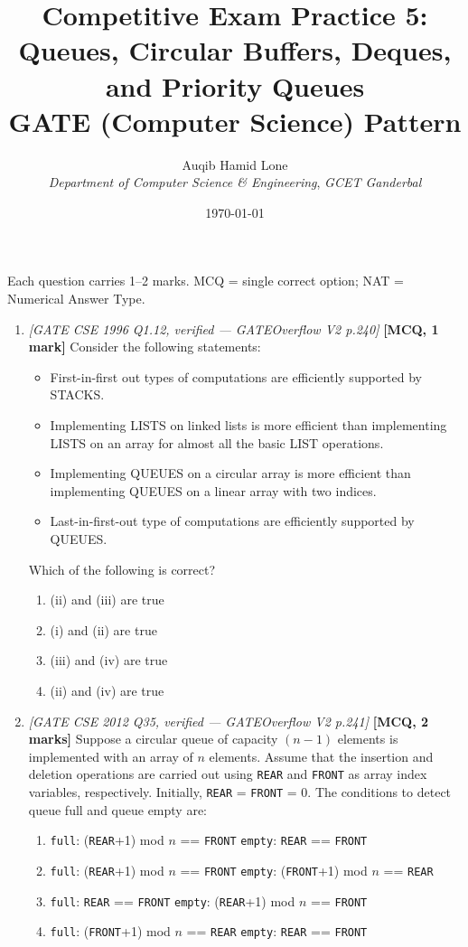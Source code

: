 \documentclass[11pt]{article}
\title{Competitive Exam Practice 5: Queues, Circular Buffers, Deques, and Priority Queues\\\large GATE (Computer Science) Pattern}
\author{Auqib Hamid Lone\\[0.3em]
  \emph{Department of Computer Science \& Engineering}, \emph{GCET Ganderbal}}
\date{\today}
\begin{document}
\maketitle

\noindent Each question carries 1--2 marks. MCQ = single correct option; NAT = Numerical Answer Type.

\begin{enumerate}
\item[\textbf{Q1}] \textit{[GATE CSE 1996 Q1.12, verified --- GATEOverflow V2 p.240]} \textbf{[MCQ, 1 mark]} Consider the following statements:
\begin{itemize}
  \item[(i)] First-in-first out types of computations are efficiently supported by STACKS.
  \item[(ii)] Implementing LISTS on linked lists is more efficient than implementing LISTS on an array for almost all the basic LIST operations.
  \item[(iii)] Implementing QUEUES on a circular array is more efficient than implementing QUEUES on a linear array with two indices.
  \item[(iv)] Last-in-first-out type of computations are efficiently supported by QUEUES.
\end{itemize}
Which of the following is correct?
\begin{enumerate}
  \item[(A)] (ii) and (iii) are true
  \item[(B)] (i) and (ii) are true
  \item[(C)] (iii) and (iv) are true
  \item[(D)] (ii) and (iv) are true
\end{enumerate}

\item[\textbf{Q2}] \textit{[GATE CSE 2012 Q35, verified --- GATEOverflow V2 p.241]} \textbf{[MCQ, 2 marks]} Suppose a circular queue of capacity $(n-1)$ elements is implemented with an array of $n$ elements. Assume that the insertion and deletion operations are carried out using \texttt{REAR} and \texttt{FRONT} as array index variables, respectively. Initially, \texttt{REAR} = \texttt{FRONT} = 0. The conditions to detect queue full and queue empty are:
\begin{enumerate}
  \item[(A)] \texttt{full}: (\texttt{REAR}+1) mod $n$ == \texttt{FRONT} \quad \texttt{empty}: \texttt{REAR} == \texttt{FRONT}
  \item[(B)] \texttt{full}: (\texttt{REAR}+1) mod $n$ == \texttt{FRONT} \quad \texttt{empty}: (\texttt{FRONT}+1) mod $n$ == \texttt{REAR}
  \item[(C)] \texttt{full}: \texttt{REAR} == \texttt{FRONT} \quad \texttt{empty}: (\texttt{REAR}+1) mod $n$ == \texttt{FRONT}
  \item[(D)] \texttt{full}: (\texttt{FRONT}+1) mod $n$ == \texttt{REAR} \quad \texttt{empty}: \texttt{REAR} == \texttt{FRONT}
\end{enumerate}


\end{enumerate}
\end{document}
